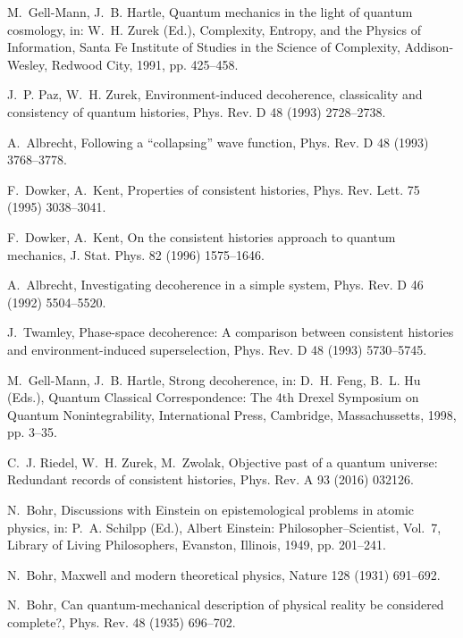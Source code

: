 \documentclass[3p,sort&compress]{elsarticle}
\begin{document}
\begin{thebibliography}{100}
M.~Gell-Mann, J.~B. Hartle, Quantum mechanics in the light of quantum
  cosmology, in: W.~H. Zurek (Ed.), Complexity, Entropy, and the Physics of
  Information, Santa Fe Institute of Studies in the Science of Complexity,
  Addison-Wesley, Redwood City, 1991, pp. 425--458.

J.~P. Paz, W.~H. Zurek, Environment-induced decoherence, classicality and
  consistency of quantum histories, Phys. Rev. D 48 (1993) 2728--2738.

A.~Albrecht, Following a ``collapsing'' wave function, Phys. Rev. D 48 (1993)
  3768--3778.

F.~Dowker, A.~Kent, Properties of consistent histories, Phys. Rev. Lett. 75
  (1995) 3038--3041.

F.~Dowker, A.~Kent, On the consistent histories approach to quantum mechanics,
  J. Stat. Phys. 82 (1996) 1575--1646.

A.~Albrecht, Investigating decoherence in a simple system, Phys. Rev. D 46
  (1992) 5504--5520.

J.~Twamley, Phase-space decoherence: {A} comparison between consistent
  histories and environment-induced superselection, Phys. Rev. D 48 (1993)
  5730--5745.

M.~Gell-Mann, J.~B. Hartle, Strong decoherence, in: D.~H. Feng, B.~L. Hu
  (Eds.), Quantum Classical Correspondence: The 4th Drexel Symposium on Quantum
  Nonintegrability, International Press, Cambridge, Massachussetts, 1998, pp.
  3--35.

C.~J. Riedel, W.~H. Zurek, M.~Zwolak, Objective past of a quantum universe:
  {R}edundant records of consistent histories, Phys. Rev. A 93 (2016) 032126.

N.~Bohr, Discussions with {E}instein on epistemological problems in atomic
  physics, in: P.~A. Schilpp (Ed.), Albert Einstein: Philosopher--Scientist,
  Vol.~7, Library of Living Philosophers, Evanston, Illinois, 1949, pp.
  201--241.

N.~Bohr, Maxwell and modern theoretical physics, Nature 128 (1931) 691--692.

N.~Bohr, Can quantum-mechanical description of physical reality be considered
  complete?, Phys. Rev. 48 (1935) 696--702.


\end{thebibliography}
\end{document}
